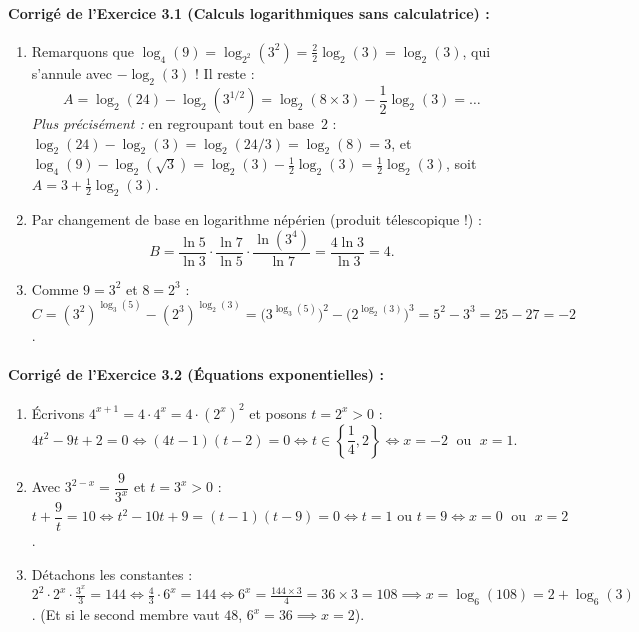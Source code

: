 \paragraph{Corrigé de l'Exercice 3.1 (Calculs logarithmiques sans calculatrice) :}
\begin{enumerate}[label=(\alph*)]
    \item Remarquons que $\log_4(9) = \log_{2^2}(3^2) = \frac{2}{2}\log_2(3) = \log_2(3)$, qui s'annule avec $-\log_2(3)$ ! Il reste :
    \[
        A = \log_2(24) - \log_2(3^{1/2}) = \log_2(8 \times 3) - \frac{1}{2}\log_2(3) = \dots
    \]
    \emph{Plus précisément :} en regroupant tout en base~$2$ : $\log_2(24) - \log_2(3) = \log_2(24/3) = \log_2(8) = 3$, et $\log_4(9) - \log_2(\sqrt{3}) = \log_2(3) - \frac{1}{2}\log_2(3) = \frac{1}{2}\log_2(3)$, soit $A = \boxed{3 + \frac{1}{2}\log_2(3)}$.
    \item Par changement de base en logarithme népérien (produit télescopique !) :
    \[
        B = \frac{\ln 5}{\ln 3} \cdot \frac{\ln 7}{\ln 5} \cdot \frac{\ln(3^4)}{\ln 7} = \frac{4\ln 3}{\ln 3} = \boxed{4}.
    \]
    \item Comme $9 = 3^2$ et $8 = 2^3$ : $C = (3^2)^{\log_3(5)} - (2^3)^{\log_2(3)} = \bigl(3^{\log_3(5)}\bigr)^2 - \bigl(2^{\log_2(3)}\bigr)^3 = 5^2 - 3^3 = 25 - 27 = \boxed{-2}$.
\end{enumerate}

\paragraph{Corrigé de l'Exercice 3.2 (Équations exponentielles) :}
\begin{enumerate}[label=(\alph*)]
    \item Écrivons $4^{x+1} = 4\cdot 4^x = 4\cdot(2^x)^2$ et posons $t = 2^x > 0$ :
    \[
        4t^2 - 9t + 2 = 0 \iff (4t - 1)(t - 2) = 0 \iff t \in \left\{\frac{1}{4}, 2\right\} \iff \boxed{x = -2 \;\text{ ou }\; x = 1}.
    \]
    \item Avec $3^{2-x} = \dfrac{9}{3^x}$ et $t = 3^x > 0$ : $t + \dfrac{9}{t} = 10 \iff t^2 - 10t + 9 = (t - 1)(t - 9) = 0 \iff t = 1 \text{ ou } t = 9 \iff \boxed{x = 0 \;\text{ ou }\; x = 2}$.
    \item Détachons les constantes : $2^2 \cdot 2^x \cdot \frac{3^x}{3} = 144 \iff \frac{4}{3} \cdot 6^x = 144 \iff 6^x = \frac{144 \times 3}{4} = 36 \times 3 = 108 \implies \boxed{x = \log_6(108) = 2 + \log_6(3)}$. (Et si le second membre vaut $48$, $6^x = 36 \implies x = 2$).
\end{enumerate}

